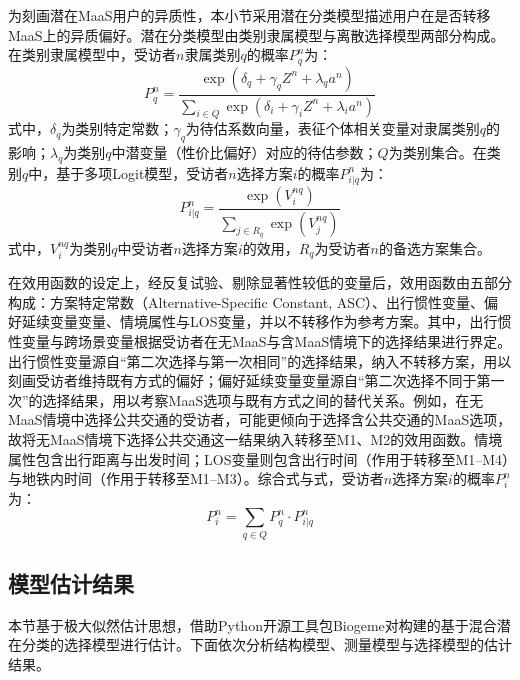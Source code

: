 为刻画潜在MaaS用户的异质性\citep{alonso-gonzalezDriversBarriersAdopting2020,kimInfluenceLatentLifestyle2022,matyasInvestigatingHeterogeneityPreferences2021}，本小节采用潜在分类模型描述用户在是否转移MaaS上的异质偏好。潜在分类模型由类别隶属模型与离散选择模型两部分构成。在类别隶属模型中，受访者$n$隶属类别$q$的概率$P_q^n$为：
\begin{equation}
P_q^n = \frac{\exp(\delta_q+\gamma_q Z^n+\lambda_q a^n)}{\sum_{i\in Q}\exp(\delta_i+\gamma_i Z^n+\lambda_i a^n)}
\label{eq.staged.shift.membership}
\end{equation}
式中，$\delta_q$为类别特定常数；$\gamma_q$为待估系数向量，表征个体相关变量对隶属类别$q$的影响；$\lambda_q$为类别$q$中潜变量（性价比偏好）对应的待估参数；$Q$为类别集合。在类别$q$中，基于多项Logit模型，受访者$n$选择方案$i$的概率$P_{i|q}^n$为：
\begin{equation}
P_{i|q}^n = \frac{\exp(V_i^{nq})}{\sum_{j\in R_q}\exp(V_j^{nq})}
\label{eq.staged.shift.classchoice}
\end{equation}
式中，$V_i^{nq}$为类别$q$中受访者$n$选择方案$i$的效用，$R_q$为受访者$n$的备选方案集合。

在效用函数的设定上，经反复试验、剔除显著性较低的变量后，效用函数由五部分构成：方案特定常数（Alternative-Specific Constant, ASC）、出行惯性变量、偏好延续变量变量、情境属性与LOS变量，并以不转移作为参考方案。其中，出行惯性变量与跨场景变量根据受访者在无MaaS与含MaaS情境下的选择结果进行界定。出行惯性变量源自``第二次选择与第一次相同''的选择结果，纳入不转移方案，用以刻画受访者维持既有方式的偏好；偏好延续变量变量源自``第二次选择不同于第一次''的选择结果，用以考察MaaS选项与既有方式之间的替代关系。例如，在无MaaS情境中选择公共交通的受访者，可能更倾向于选择含公共交通的MaaS选项，故将无MaaS情境下选择公共交通这一结果纳入转移至M1、M2的效用函数。情境属性包含出行距离与出发时间；LOS变量则包含出行时间（作用于转移至M1--M4）与地铁内时间（作用于转移至M1--M3）。综合式与式，受访者$n$选择方案$i$的概率$P_i^n$为：
\begin{equation}
P_i^n = \sum_{q\in Q} P_q^n \cdot P_{i|q}^n
\label{eq.staged.shift.final}
\end{equation}

\subsection{模型估计结果}\label{subsec.staged.shift.result}

本节基于极大似然估计思想，借助Python开源工具包Biogeme\citep{bierlairePythonBiogemeShortIntroduction2016}对构建的基于混合潜在分类的选择模型进行估计。下面依次分析结构模型、测量模型与选择模型的估计结果。

